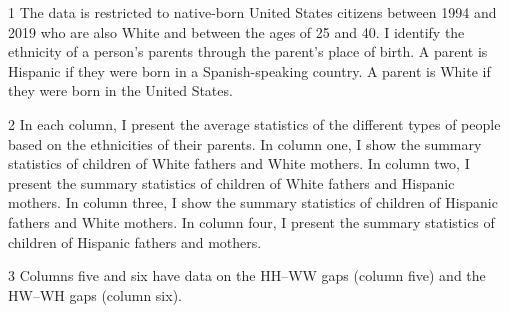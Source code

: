 \begin{table}[!h]
{\begin{threeparttable}
\begin{tabular}[t]{lcccccc}
\bottomrule
\end{tabular}
\begin{tablenotes}
\item[1] The data is restricted to native-born United States citizens between 1994 and 2019 who are also White and between the ages of 25 and 40. I identify the ethnicity of a person's parents through the parent's place of birth. A parent is Hispanic if they were born in a Spanish-speaking country. A parent is White if they were born in the United States.
\item[2] In each column, I present the average statistics of the different types of people based on the ethnicities of their parents. In column one, I show the summary statistics of children of White fathers and White mothers. In column two, I present the summary statistics of children of White fathers and Hispanic mothers. In column three, I show the summary statistics of children of Hispanic fathers and White mothers. In column four, I present the summary statistics of children of Hispanic fathers and mothers.
\item[3] Columns five and six have data on the HH--WW gaps (column five) and the HW--WH gaps (column six).
\end{tablenotes}
\end{threeparttable}}
\end{table}
